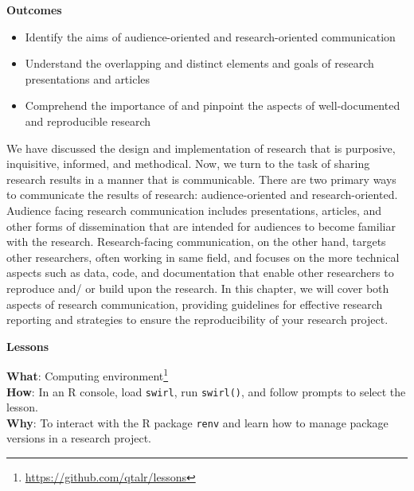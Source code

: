 \documentclass[
  letterpaper,
]{latex/krantz}
\providecommand{\tightlist}{%
  \setlength{\itemsep}{0pt}\setlength{\parskip}{0pt}}\usepackage{longtable,booktabs,array}
\theoremstyle{definition}
\theoremstyle{remark}
\DeclareRobustCommand{\href}[2]{#2\footnote{\url{#1}}}
\begin{document}
\begin{tcolorbox}[enhanced jigsaw, colback=white, colframe=quarto-callout-color-frame, leftrule=.75mm, opacityback=0, rightrule=.15mm, bottomrule=.15mm, toprule=.15mm, breakable, left=2mm, arc=.35mm]

\textbf{ Outcomes}

\begin{itemize}
\tightlist
\item
  Identify the aims of audience-oriented and research-oriented
  communication
\item
  Understand the overlapping and distinct elements and goals of research
  presentations and articles
\item
  Comprehend the importance of and pinpoint the aspects of
  well-documented and reproducible research
\end{itemize}

\end{tcolorbox}

We have discussed the design and implementation of research that is
purposive, inquisitive, informed, and methodical. Now, we turn to the
task of sharing research results in a manner that is communicable. There
are two primary ways to communicate the results of research:
audience-oriented and research-oriented. Audience facing research
communication includes presentations, articles, and other forms of
dissemination that are intended for audiences to become familiar with
the research. Research-facing communication, on the other hand, targets
other researchers, often working in same field, and focuses on the more
technical aspects such as data, code, and documentation that enable
other researchers to reproduce and/ or build upon the research. In this
chapter, we will cover both aspects of research communication, providing
guidelines for effective research reporting and strategies to ensure the
reproducibility of your research project.

\begin{tcolorbox}[enhanced jigsaw, colback=white, colframe=quarto-callout-color-frame, leftrule=.75mm, opacityback=0, rightrule=.15mm, bottomrule=.15mm, toprule=.15mm, breakable, left=2mm, arc=.35mm]

\textbf{ Lessons}

\textbf{What}: \href{https://github.com/qtalr/lessons}{Computing
environment}\\
\textbf{How}: In an R console, load \texttt{swirl}, run
\texttt{swirl()}, and follow prompts to select the lesson.\\
\textbf{Why}: To interact with the R package \texttt{renv} and learn how
to manage package versions in a research project.

\end{tcolorbox}
\end{document}
